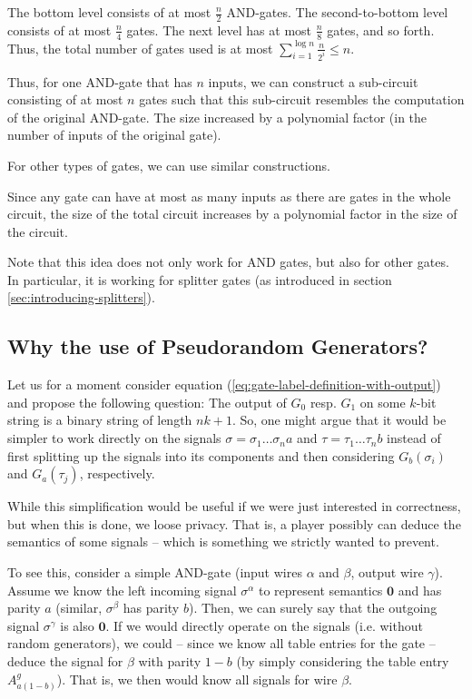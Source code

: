 The bottom level consists of at most $\frac{n}{2}$ AND-gates. The second-to-bottom level consists of at most $\frac{n}{4}$ gates. The next level has at most $\frac{n}{8}$ gates, and so forth. Thus, the total number of gates used is at most $\sum_{i=1}^{\log n} \frac{n}{2^i}\leq n$.

Thus, for one AND-gate that has $n$ inputs, we can construct a sub-circuit consisting of at most $n$ gates such that this sub-circuit resembles the computation of the original AND-gate. The size increased by a polynomial factor (in the number of inputs of the original gate). 

For other types of gates, we can use similar constructions.

Since any gate can have at most as many inputs as there are gates in the whole circuit, the size of the total circuit increases by a polynomial factor in the size of the circuit.

Note that this idea does not only work for AND gates, but also for other gates. In particular, it is working for splitter gates (as introduced in section \ref{sec:introducing-splitters}).

\subsection{Why the use of Pseudorandom Generators?}
\label{sec:appendix-why-pseudorandom-generators}

Let us for a moment consider equation (\ref{eq:gate-label-definition-with-output}) and propose the following question: The output of $G_0$ resp. $G_1$ on some $k$-bit string is a binary string of length $nk+1$. So, one might argue that it would be simpler to work directly on the signals $\sigma=\sigma_1\dots\sigma_n a$ and $\tau=\tau_1\dots\tau_n b$ instead of first splitting up the signals into its components and then considering $G_b(\sigma_i)$ and $G_a(\tau_j)$, respectively.

While this simplification would be useful if we were just interested in correctness, but when this is done, we loose privacy. That is, a player possibly can deduce the semantics of some signals -- which is something we strictly wanted to prevent.

To see this, consider a simple AND-gate (input wires $\alpha$ and $\beta$, output wire $\gamma$). Assume we know the left incoming signal $\sigma^\alpha$ to represent semantics $\mathbf{0}$ and has parity $a$ (similar, $\sigma^\beta$ has parity $b$). Then, we can surely say that the outgoing signal $\sigma^\gamma$ is also $\mathbf{0}$. If we would directly operate on the signals (i.e. without random generators), we could -- since we know all table entries for the gate -- deduce the signal for $\beta$ with parity $1-b$ (by simply considering the table entry $A^g_{a(1-b)}$). That is, we then would know all signals for wire $\beta$.

